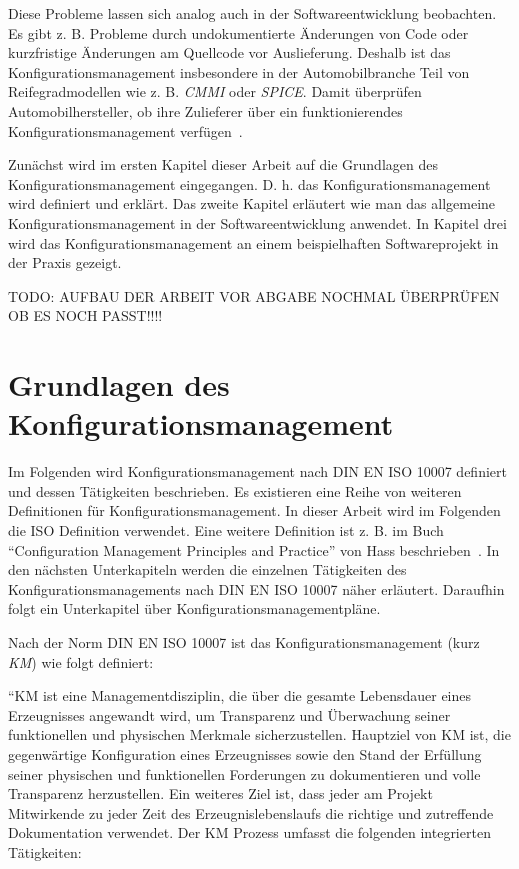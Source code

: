 \documentclass[runningheads,a4paper]{uwsese}
\begin{document}
Diese Probleme lassen sich analog auch in der Softwareentwicklung beobachten.
Es gibt z. B. Probleme durch undokumentierte Änderungen von Code oder
kurzfristige Änderungen am Quellcode vor Auslieferung. Deshalb ist das
Konfigurationsmanagement insbesondere in der
Automobilbranche Teil von Reifegradmodellen wie z. B. {\em CMMI} oder
{\em SPICE}. Damit überprüfen Automobilhersteller, ob ihre Zulieferer über ein
funktionierendes Konfigurationsmanagement verfügen~\cite[S. 2f]{weischedel2002}.

Zunächst wird im ersten Kapitel dieser Arbeit auf die Grundlagen des
Konfigurationsmanagement eingegangen. D. h. das Konfigurationsmanagement wird
definiert und erklärt.
Das zweite Kapitel erläutert wie man das allgemeine Konfigurationsmanagement in
der Softwareentwicklung anwendet.
In Kapitel drei wird das Konfigurationsmanagement an einem beispielhaften
Softwareprojekt in der Praxis gezeigt.

TODO: AUFBAU DER ARBEIT VOR ABGABE NOCHMAL ÜBERPRÜFEN OB ES NOCH PASST!!!!

\section{Grundlagen des Konfigurationsmanagement}
Im Folgenden wird Konfigurationsmanagement nach DIN EN ISO 10007 definiert und
dessen Tätigkeiten beschrieben. Es existieren eine Reihe von weiteren
Definitionen für Konfigurationsmanagement.
In dieser Arbeit wird im Folgenden die ISO Definition verwendet. Eine weitere
Definition ist z. B. im Buch ``Configuration Management Principles and
Practice'' von Hass beschrieben~\cite{Hass:2003:CMP:582584}. In den nächsten
Unterkapiteln werden die einzelnen Tätigkeiten des Konfigurationsmanagements
nach DIN EN ISO 10007 näher erläutert. Daraufhin folgt ein Unterkapitel über
Konfigurationsmanagementpläne.

Nach der Norm DIN EN ISO 10007 ist das Konfigurationsmanagement (kurz {\em KM})
wie folgt definiert:

``KM ist eine Managementdisziplin, die über die gesamte Lebensdauer eines
Erzeugnisses angewandt wird, um Transparenz und Überwachung seiner funktionellen
und physischen Merkmale sicherzustellen. Hauptziel von KM ist, die
gegenwärtige Konfiguration eines Erzeugnisses sowie den Stand der Erfüllung
seiner physischen und funktionellen Forderungen zu dokumentieren und volle
Transparenz herzustellen. Ein weiteres Ziel ist, dass jeder am Projekt
Mitwirkende zu jeder Zeit des Erzeugnislebenslaufs die richtige und zutreffende
Dokumentation verwendet. Der KM Prozess umfasst die folgenden integrierten
Tätigkeiten:
\end{document}
